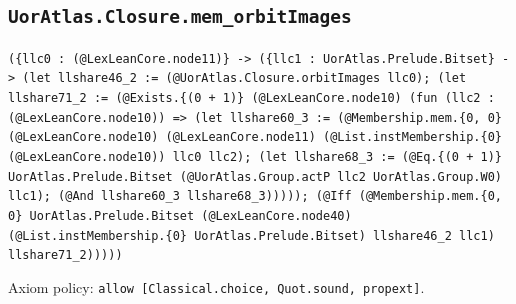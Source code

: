 \documentclass[11pt]{article}
\begin{document}
\subsection*{\texttt{UorAtlas.Closure.mem\_orbitImages}}
\noindent\texttt{(\{llc0 : (@LexLeanCore.node11)\} -> (\{llc1 : UorAtlas.Prelude.Bitset\} -> (let llshare46\_2 := (@UorAtlas.Closure.orbitImages llc0); (let llshare71\_2 := (@Exists.\{(0 + 1)\} (@LexLeanCore.node10) (fun (llc2 : (@LexLeanCore.node10)) => (let llshare60\_3 := (@Membership.mem.\{0, 0\} (@LexLeanCore.node10) (@LexLeanCore.node11) (@List.instMembership.\{0\} (@LexLeanCore.node10)) llc0 llc2); (let llshare68\_3 := (@Eq.\{(0 + 1)\} UorAtlas.Prelude.Bitset (@UorAtlas.Group.actP llc2 UorAtlas.Group.W0) llc1); (@And llshare60\_3 llshare68\_3))))); (@Iff (@Membership.mem.\{0, 0\} UorAtlas.Prelude.Bitset (@LexLeanCore.node40) (@List.instMembership.\{0\} UorAtlas.Prelude.Bitset) llshare46\_2 llc1) llshare71\_2)))))}\par
\noindent Axiom policy: \texttt{allow [Classical.choice, Quot.sound, propext]}.\par
\end{document}
